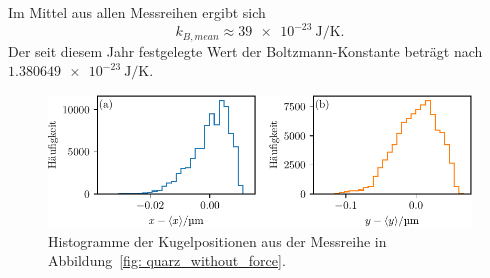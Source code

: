 Im Mittel aus allen Messreihen ergibt sich
\begin{equation}
  k_{B, mean} \approx \SI{39e-23}{\joule\per\kelvin}.
\end{equation}
Der seit diesem Jahr festgelegte Wert der Boltzmann-Konstante beträgt nach~\cite{k_b} $\SI{1.380649e-23}{\joule\per\kelvin}$.
\begin{figure}
  \centering
  \includegraphics[scale = 1 ]{../analysis/data/i_quarz/70mA/results/without_force_histogram_70mA.pdf}
  \caption{Histogramme der Kugelpositionen aus der Messreihe in Abbildung~\ref{fig: quarz_without_force}.}
  \label{fig: quarz_without_force_hist}
\end{figure}

